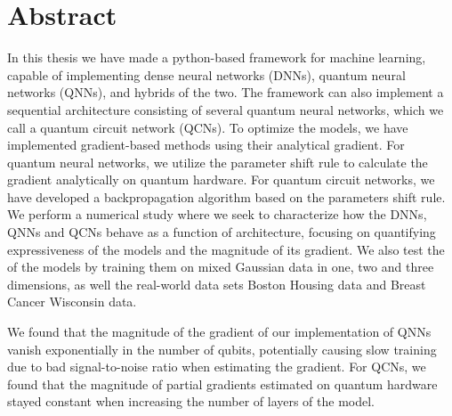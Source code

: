 \chapter*{Abstract}
\thispagestyle{plain}

In this thesis we have made a python-based framework for machine learning, capable of implementing dense neural networks (DNNs), quantum neural networks (QNNs), and hybrids of the two. The framework can also implement a sequential architecture consisting of several quantum neural networks, which we call a quantum circuit network (QCNs). To optimize the models, we have implemented gradient-based methods using their analytical gradient. For quantum neural networks, we utilize the parameter shift rule to calculate the gradient analytically on quantum hardware. For quantum circuit networks, we have developed a backpropagation algorithm based on the parameters shift rule. We perform a numerical study where we seek to characterize how the DNNs, QNNs and QCNs  behave as a function of architecture, focusing on quantifying expressiveness of the models and the magnitude of its gradient. We also test the of the models by training them on mixed Gaussian data in one, two and three dimensions, as well the real-world data sets Boston Housing data and Breast Cancer Wisconsin data.

We found that the magnitude of the gradient of our implementation of QNNs vanish exponentially in the number of qubits, potentially causing slow training due to bad signal-to-noise ratio when estimating the gradient. For QCNs, we found that the magnitude of partial gradients estimated on quantum hardware stayed constant when increasing the number of layers of the model. 